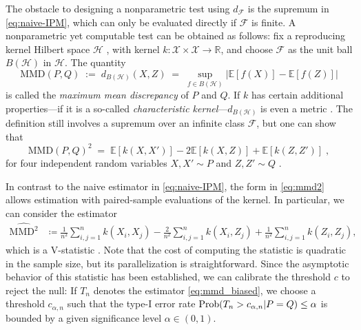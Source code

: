 \documentclass{article}
\begin{document}
The obstacle to designing a nonparametric test using $d_\mathcal{F}$
is the supremum in \eqref{eq:naive-IPM}, which can only be evaluated directly if
$\mathcal{F}$ is finite.
A nonparametric yet computable test
can be obtained as follows: fix a reproducing kernel
Hilbert space $\mathcal{H}$ \cite[see e.g.,][Definition 4.18]{steinwart_support_2008}, with kernel
${k:\mathcal{X}\times\mathcal{X}\rightarrow\mathbb{R}}$, and 
choose $\mathcal{F}$ as the unit ball ${B(\mathcal{H})}$ in $\mathcal{H}$.
The quantity
\begin{equation*}
  \mathrm{MMD}(P,Q)
  \;:=\;
  d_{B(\mathcal{H})}(X,Z)
  \;=\;
  \sup_{f\in B(\mathcal{H})}|\mathbb{E}[f(X)]-\mathbb{E}[f(Z)]|
\end{equation*}
is called the \emph{maximum mean discrepancy} of $P$ and $Q$.
If $k$ has certain additional properties---if it is a
so-called \emph{characteristic kernel}---$d_{B(\mathcal{H})}$ is even
a metric \citep{fukumizu_kernel_2007, sriperumbudur_universality_2011}.
The definition still involves a supremum over an infinite class
$\mathcal{F}$, but one can show that
\begin{equation}
  \mathrm{MMD}(P,Q)^2\;=\;\mathbb{E}[k(X,X')]-2\mathbb{E}[k(X,Z)]+\mathbb{E}[k(Z,Z')]\;,\label{eq:mmd2}
\end{equation}
for four independent random variables ${X,X'\sim P}$ and ${Z,Z'\sim
  Q}$ \citep{gretton_kernel_2012}.


  
In contrast to the naive estimator in \eqref{eq:naive-IPM}, the form in \eqref{eq:mmd2} allows estimation with paired-sample evaluations of the kernel. 
In particular, we can consider the estimator 
\begin{align}
        \widehat{\mathrm{MMD}^2} &\coloneqq \frac{1}{n^2}  \sum_{i,j=1}^n k\left(X_{i}, X_{j}\right)
        -\frac{2}{n^2} \sum_{i,j=1}^{n} k\left(X_{i}, Z_{j}\right)+\frac{1}{n^2}\sum_{i,j=1}^{n} k\left(Z_{i}, Z_{j}\right), \label{eq:mmd_biased}
\end{align}
which is a V-statistic \citep{Vaart_1998,Mises1947asymptotic}. Note that the cost of computing the statistic is quadratic in the sample size, but its parallelization is straightforward. 
Since the asymptotic behavior of this statistic has been established, we can calibrate the threshold $c$ to reject the null:
If $T_n$ denotes the estimator \eqref{eq:mmd_biased}, we choose a threshold $c_{\alpha, n}$ such that the type-I error rate $\mathrm{Prob} (T_n > c_{\alpha, n}\vert P=Q)\leq \alpha$ is bounded by a given significance level $\alpha \in (0,1)$.
\end{document}
